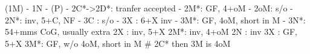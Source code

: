 (1M) - 1N - (P) - 
2C*->2D*: tranfer accepted
        - 2M*: GF, 4+oM
        - 2oM: s/o
        - 2N*: inv, 5+C, NF
        - 3C : s/o
        - 3X : 6+X inv
        - 3M*: GF, 4oM, short in M
        - 3N*: 54+mms CoG, usually extra
2X : inv, 5+X
2M*: inv, 4+oM
2N : inv
3X : GF, 5+X
3M*: GF, w/o 4oM, short in M  # 2C* then 3M is 4oM